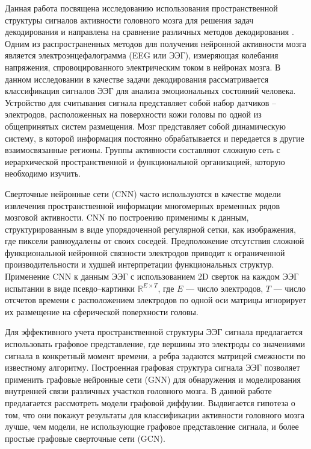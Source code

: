 \documentclass{article}
\begin{document}
Данная работа посвящена исследованию использования пространственной структуры сигналов активности головного мозга для решения задач декодирования и направлена на сравнение различных методов декодирования \cite{gcnsnet2020, Hou_2020, LI2023833}. Одним из распространенных методов для получения нейронной активности мозга является электроэнцефалограмма (EEG или ЭЭГ), измеряющая колебания
напряжения, спровоцированного электрическим током в нейронах мозга. В данном исследовании в качестве задачи декодирования рассматривается классификация сигналов ЭЭГ для анализа эмоциональных состояний человека. Устройство для считывания сигнала представляет собой
набор датчиков – электродов, расположенных на поверхности кожи головы по одной
из общепринятых систем размещения. Мозг представляет собой динамическую систему, в которой информация постоянно обрабатывается и передается в другие взаимосвязанные регионы. Группы
активности составляют сложную сеть с иерархической пространственной и функциональной организацией, которую необходимо изучить. 
\par 
Сверточные нейронные
сети (CNN) часто используются в качестве модели извлечения пространственной информации многомерных временных рядов мозговой активности. \cite{Hou_2020, LI2023833} CNN по построению применимы к
данным, структурированным в виде упорядоченной регулярной сетки, как изображения, где пиксели равноудалены от своих соседей. Предположение отсутствия сложной
функциональной нейронной связности электродов приводит к ограниченной производительности и худшей интерпретации функциональных структур. Применение CNN
к данным ЭЭГ с использованием 2D сверток на каждом ЭЭГ испытании в виде псевдо–картинки $\mathbb{R}^{E\times T}$, где $E$ — число
электродов, $T$ — число отсчетов времени с расположением электродов по одной оси матрицы игнорирует их размещение на сферической поверхности головы. 
\par Для эффективного учета пространственной структуры ЭЭГ сигнала предлагается использовать графовое представление, где вершины это электроды со значениями
сигнала в конкретный момент времени, а ребра задаются матрицей смежности по известному алгоритму. Построенная графовая структура сигнала ЭЭГ позволяет применить графовые
нейронные сети (GNN) \cite{gcnsnet2020, chamberlain2021blend, varenik2022} для обнаружения и моделирования внутренней связи
различных участков головного мозга. В данной работе предлагается рассмотреть модели графовой диффузии. Выдвигается гипотеза о том, что они покажут результаты для классификации активности головного мозга лучше, чем модели, не использующие графовое представление сигнала, и более простые графовые сверточные сети (GCN).

\end{document}
